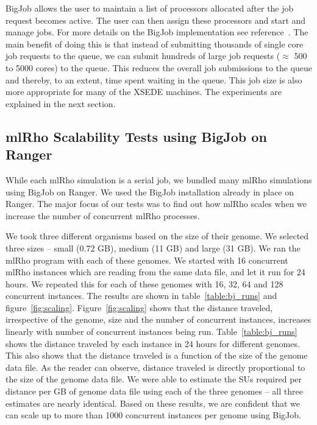 \documentclass{sig-alternate}
\begin{document}
BigJob allows the user to maintain a list of processors allocated after the job request becomes active. The user can then assign these processors and start and manage jobs. For more details on the BigJob implementation see reference~\cite{saga_bigjob_condor_cloud}. The main benefit of doing this is that instead of submitting thousands of single core job requests to the queue, we can submit hundreds of large job requests ($\approx$ 500 to 5000 cores) to the queue. This reduces the overall job submissions to the queue and thereby, to an extent, time spent waiting in the queue. This job size is also more appropriate for many of the XSEDE machines. The experiments are explained in the next section. 


\subsection{mlRho Scalability Tests using BigJob on Ranger }
\label{sec:tests}

While each mlRho simulation is a serial job, we bundled many mlRho simulations using BigJob on Ranger. 
We used the BigJob installation already in place on Ranger. The major focus of our tests was to find out how mlRho scales when we increase the number of concurrent mlRho processes. 

We took three different organisms based on the size of their genome. We selected three sizes -- small (0.72 GB), medium (11 GB) and large (31 GB). We ran the mlRho program with each of these genomes. We started with 16 concurrent mlRho instances which are reading from the same data file, and let it run for 24 hours. We repeated this for each of these genomes with 16, 32, 64 and 128 concurrent instances. The results are shown in table~\ref{table:bj_runs} and figure~\ref{fig:scaling}.
Figure~\ref{fig:scaling} shows that the distance traveled, irrespective of the genome, size and the number of concurrent instances, increases linearly with number of concurrent instances being run. Table~\ref{table:bj_runs} shows the distance traveled by each instance in 24 hours for different genomes. This also shows that the distance traveled is a function of the size of the genome data file. As the reader can observe, distance traveled is directly proportional to the size of the genome data file. We were able to estimate the SUs required per distance per GB of genome data file using each of the three genomes -- all three estimates are nearly identical. Based on these results, we are confident that we can scale up to more than 1000 concurrent instances per genome using BigJob.
\end{document}
